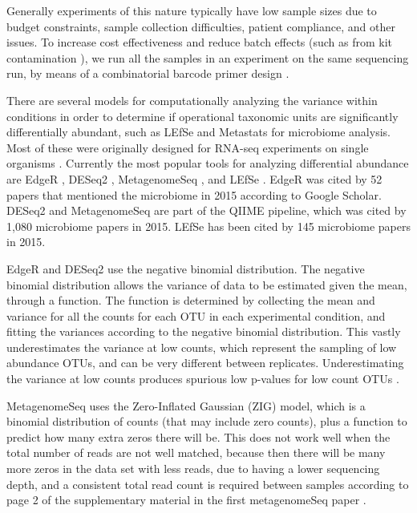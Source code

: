 Generally experiments of this nature typically have low sample sizes due to budget constraints, sample collection difficulties, patient compliance, and other issues. To increase cost effectiveness and reduce batch effects (such as from kit contamination \cite{salter2014reagent}), we run all the samples in an experiment on the same sequencing run, by means of a combinatorial barcode primer design \cite{gloor2010microbiome}.

There are several models for computationally analyzing the variance within conditions in order to determine if operational taxonomic units are significantly differentially abundant, such as LEfSe \cite{segata2011metagenomic} and Metastats \cite{paulson2011metastats} for microbiome analysis. Most of these were originally designed for RNA-seq experiments on single organisms \cite{pachter2011models}. Currently the most popular tools for analyzing differential abundance are EdgeR \cite{robinson2010edger}, DESeq2 \cite{love2014moderated}, MetagenomeSeq \cite{paulson2014metagenomeseq}, and LEfSe \cite{segata2011metagenomic}. EdgeR was cited by 52 papers that mentioned the microbiome in 2015 according to Google Scholar. DESeq2 and MetagenomeSeq are part of the QIIME pipeline, which was cited by 1,080 microbiome papers in 2015. LEfSe has been cited by 145 microbiome papers in 2015.

EdgeR and DESeq2 use the negative binomial distribution. The negative binomial distribution allows the variance of data to be estimated given the mean, through a function. The function is determined by collecting the mean and variance for all the counts for each OTU in each experimental condition, and fitting the variances according to the negative binomial distribution. This vastly underestimates the variance at low counts, which represent the sampling of low abundance OTUs, and can be very different between replicates. Underestimating the variance at low counts produces spurious low p-values for low count OTUs \cite{fernandes2013anova}.

MetagenomeSeq uses the Zero-Inflated Gaussian (ZIG) model, which is a binomial distribution of counts (that may include zero counts), plus a function to predict how many extra zeros there will be. This does not work well when the total number of reads are not well matched, because then there will be many more zeros in the data set with less reads, due to having a lower sequencing depth, and a consistent total read count is required between samples according to page 2 of the supplementary material in the first metagenomeSeq paper \cite{paulson2014metagenomeseq}.

